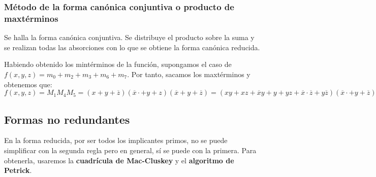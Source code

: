 \subsubsection{Método de la forma canónica conjuntiva o producto de maxtérminos}
Se halla la forma canónica conjuntiva. Se distribuye el producto sobre la suma y se realizan todas las absorciones con lo que se obtiene la forma canónica reducida.
\begin{ejemplo}
    Habiendo obtenido los mintérminos de la función, supongamos el caso de $f(x,y,z) =m_0+m_2+m_3+m_6+m_7$. Por tanto, sacamos los maxtérminos y obtenemos que: \\
    $f(x,y,z) =M_1M_4M_5 = (x+y+\overline{z})(\overline{x} \cdot +y+z)(\overline{x} +y+\overline{z})= (xy+xz+\overline{x}y+y+yz+\overline{x} \cdot \overline{z}+y\overline{z})(\overline{x} \cdot +y+\overline{z})= (xz+y+\overline{x} \cdot \overline{z})(\overline{x} +y+\overline{z})=xyz+\overline{x}y+y+y\overline{z}+\overline{x} \cdot \overline{z}+\overline{x}y \overline{z}+\overline{x} \cdot \overline{z}=y+\overline{x} \cdot \overline{z}$
\end{ejemplo}

\subsection{Formas no redundantes}
En la forma reducida, por ser todos los implicantes primos, no se puede simplificar con la segunda regla pero en general, sí se puede con la primera. Para obtenerla, usaremos la \textbf{cuadrícula de Mac-Cluskey} y el \textbf{algoritmo de Petrick}.
